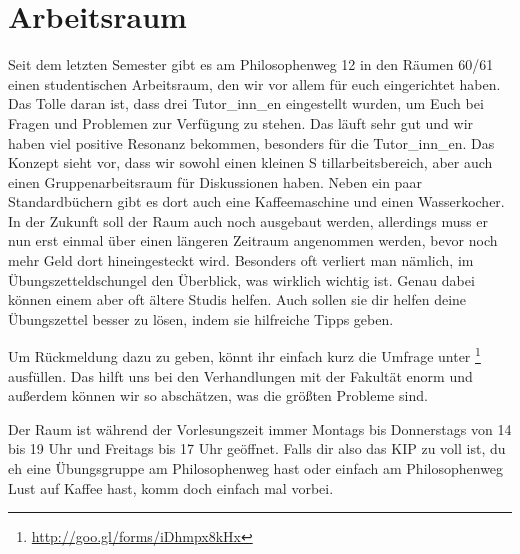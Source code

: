 \section{Arbeitsraum}

Seit dem letzten Semester gibt es am Philosophenweg 12 in den Räumen 60/61 einen studentischen 
Arbeitsraum, den wir vor allem für euch eingerichtet haben. Das Tolle daran ist, dass drei 
Tutor_inn_en eingestellt wurden, um Euch bei Fragen und Problemen zur Verfügung zu stehen. Das 
läuft sehr gut und wir haben viel positive Resonanz bekommen, 
besonders für die Tutor_inn_en. Das Konzept sieht vor, dass wir sowohl einen kleinen S
tillarbeitsbereich, aber auch einen Gruppenarbeitsraum für Diskussionen haben. Neben ein paar 
Standardbüchern gibt es dort auch eine Kaffeemaschine und einen Wasserkocher. In der 
Zukunft soll der Raum auch noch ausgebaut werden, allerdings muss er nun erst einmal über einen 
längeren Zeitraum angenommen werden, bevor noch mehr Geld dort hineingesteckt wird.
Besonders oft verliert man nämlich, im Übungszetteldschungel den Überblick, was wirklich 
wichtig ist. Genau dabei können einem
aber oft ältere Studis helfen. Auch sollen sie dir helfen deine Übungszettel besser zu lösen, 
indem sie hilfreiche Tipps geben. 

Um Rückmeldung dazu zu geben, könnt ihr einfach kurz die Umfrage unter 
\footnote{\url{http://goo.gl/forms/iDhmpx8kHx}} ausfüllen. Das hilft uns bei den 
Verhandlungen mit der Fakultät enorm und außerdem können wir so abschätzen, 
was die größten Probleme sind.

Der Raum ist während der Vorlesungszeit immer Montags bis Donnerstags von 14 bis 19 Uhr und 
Freitags bis 17 Uhr geöffnet. Falls dir also das KIP zu voll ist, du eh eine Übungsgruppe am 
Philosophenweg hast oder einfach am Philosophenweg Lust auf Kaffee hast, komm doch einfach mal vorbei.
